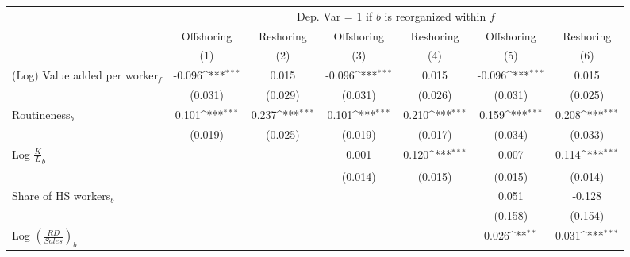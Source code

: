 \begin{table}[htbp] \footnotesize \centering
\def\sym#1{\ifmmode^{#1}\else\(^{#1}\)\fi}
\renewcommand{\arraystretch}{1}
\begin{tabular}{l*{6}{c}}
\toprule
&\multicolumn{6}{c}{Dep. Var = 1 if $ b $ is reorganized within $ f $} \\
\cmidrule(lr){2-7}
                &\multicolumn{1}{c}{Offshoring}&\multicolumn{1}{c}{Reshoring}&\multicolumn{1}{c}{Offshoring}&\multicolumn{1}{c}{Reshoring}&\multicolumn{1}{c}{Offshoring}&\multicolumn{1}{c}{Reshoring}\\\cmidrule(lr){2-2}\cmidrule(lr){3-3}\cmidrule(lr){4-4}\cmidrule(lr){5-5}\cmidrule(lr){6-6}\cmidrule(lr){7-7}
                &\multicolumn{1}{c}{(1)}         &\multicolumn{1}{c}{(2)}         &\multicolumn{1}{c}{(3)}         &\multicolumn{1}{c}{(4)}         &\multicolumn{1}{c}{(5)}         &\multicolumn{1}{c}{(6)}         \\
\midrule
(Log) Value added per worker$ _f$&   -0.096\sym{***}&    0.015         &   -0.096\sym{***}&    0.015         &   -0.096\sym{***}&    0.015         \\
                &  (0.031)         &  (0.029)         &  (0.031)         &  (0.026)         &  (0.031)         &  (0.025)         \\
\addlinespace
Routineness$ _b$&    0.101\sym{***}&    0.237\sym{***}&    0.101\sym{***}&    0.210\sym{***}&    0.159\sym{***}&    0.208\sym{***}\\
                &  (0.019)         &  (0.025)         &  (0.019)         &  (0.017)         &  (0.034)         &  (0.033)         \\
\addlinespace
Log $\frac{K}{L}_b$&                  &                  &    0.001         &    0.120\sym{***}&    0.007         &    0.114\sym{***}\\
                &                  &                  &  (0.014)         &  (0.015)         &  (0.015)         &  (0.014)         \\
\addlinespace
Share of HS workers$ _b$&                  &                  &                  &                  &    0.051         &   -0.128         \\
                &                  &                  &                  &                  &  (0.158)         &  (0.154)         \\
\addlinespace
Log $(\frac{RD}{Sales})_b$&                  &                  &                  &                  &    0.026\sym{**} &    0.031\sym{***}\\

\end{tabular}
\end{table}
